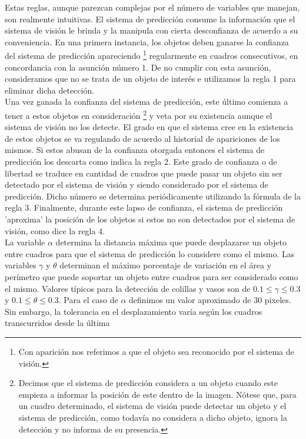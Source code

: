 Estas reglas, aunque parezcan complejas por el número de variables que 
manejan, son realmente intuitivas. El sistema de predicción consume la 
información que el sistema de visión le brinda y la manipula con 
cierta desconfianza de acuerdo a su 
conveniencia. En una primera instancia, los objetos deben ganarse la 
confianza del sistema de predicción apareciendo \footnote{Con 
aparición nos referimos a que el objeto sea reconocido por el sistema 
de visión.} regularmente en 
cuadros consecutivos, en concordancia con la asunción número 
1. De no cumplir con esta asunción, consideramos que no se trata de un 
objeto de interés e utilizamos la regla 1 para eliminar dicha detección. \\
	Una vez ganada la confianza del sistema de predicción, este 
	último comienza a tener a estos objetos en consideración 
	\footnote{Decimos que el sistema de predicción considera a un 
	objeto cuando este empieza a informar la posición de este dentro de la 
	imagen. Nótese que, para un cuadro determinado, el sistema de 
	visión puede detectar un objeto y el sistema de predicción, como 
	todavía no considera a dicho objeto, ignora la detección y no informa de su 
	presencia.} y veta por su 
existencia aunque el sistema de visión no los detecte. El grado en que 
el sistema cree en la existencia de estos objetos se va regulando de 
acuerdo al historial de apariciones de los mismos. Si estos abusan de 
la confianza otorgada entonces el sistema de predicción los descarta 
como indica la regla 2. 
Este grado de confianza o de libertad se traduce en cantidad de 
cuadros que puede pasar un objeto sin ser detectado por el sistema de 
visión y siendo considerado por el sistema de predicción. Dicho 
número se determina periódicamente utilizando la fórmula de la regla 3.
Finalmente, durante este lapso de confianza, el sistema de predicción 
'aproxima' la posición de los objetos si estos no son detectados por el 
sistema de visión, como dice la regla 4. \\
\indent La variable $\alpha$ determina la distancia máxima que puede 
desplazarse un objeto entre cuadros para que el sistema de predicción lo considere 
como el mismo. Las variables $\gamma$ y $\theta$ determinan el máximo 
porcentaje de variación en el área y perímetro que puede soportar un 
objeto entre cuadros para ser considerado como el mismo. Valores 
típicos para la detección de colillas y vasos son de 
$0.1\leq\gamma\leq0.3$ y $0.1\leq\theta\leq0.3$. Para el caso de 
$\alpha$ definimos un valor aproximado de 30 pixeles. Sin embargo, la 
tolerancia en el desplazamiento varía según los cuadros transcurridos desde la última 
